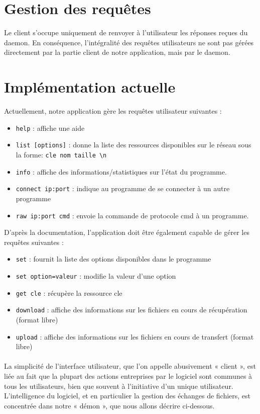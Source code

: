 	\section{Gestion des requ\^etes}

Le client s'occupe uniquement de renvoyer à l'utilisateur les réponses reçues
du daemon. En conséquence, l'intégralité des requêtes utilisateurs ne sont pas 
gérées directement par la partie client de notre application, mais par le 
daemon.
	
	\section{Implémentation actuelle}

Actuellement, notre application gère les requêtes utilisateur suivantes :
\begin{itemize}
\item \verb"help" : affiche une aide
\item \verb"list [options]" : donne la liste des ressources disponibles sur le 
      réseau sous la forme: \verb"cle nom taille \n"
\item \verb"info" : affiche des informations/statistiques sur l'état du 
      programme.
\item \verb"connect ip:port" : indique au programme de se connecter à un autre 
      programme
\item \verb"raw ip:port cmd" : envoie la commande de protocole cmd à un 
      programme. 
\end{itemize}

D'après la documentation, l'application doit être également capable de gérer 
les requêtes suivantes :
\begin{itemize}
\item \verb"set" : fournit la liste des options disponibles dans le programme
\item \verb"set option=valeur" : modifie la valeur d'une option
\item \verb"get cle" : récupère la ressource cle
\item \verb"download" : affiche des informations sur les fichiers en cours de 
      récupération (format libre)
\item \verb"upload" : affiche des informations sur les fichiers en cours de 
      transfert (format libre)
\end{itemize}
	
	\paragraph{}La simplicité de l'interface utilisateur, que l'on appelle 
	abusivement « client », est liée au fait que la plupart des actions 
	entreprises par le logiciel sont communes à tous les utilisateurs, 
	bien que souvent à l'initiative d'un unique utilisateur. L'intelligence 
	du logiciel, et en particulier la gestion des échanges de fichiers,
	est concentrée dans notre « démon », que nous allons décrire ci-dessous.
